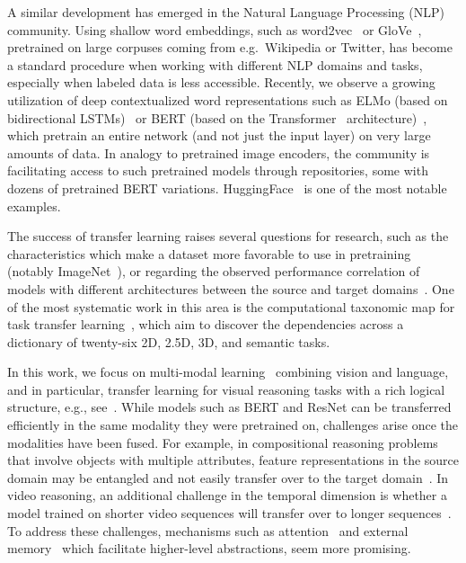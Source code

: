 A similar development has emerged in the Natural Language Processing (NLP) community.
Using shallow word embeddings, such as word2vec~\cite{mikolov2013distributed} or GloVe~\cite{pennington2014glove}, pretrained on large corpuses coming from e.g.\ Wikipedia or Twitter, has become a standard procedure when working with different NLP domains and tasks, 
especially when labeled data is less accessible.
Recently, we observe a growing utilization of deep contextualized word representations such as ELMo (based on bidirectional LSTMs)~\cite{peters2018deep} or BERT (based on the Transformer~\cite{vaswani2017attention} architecture)~\cite{devlin2018bert}, which pretrain an entire network (and not just the input layer) on very large amounts of data.
In analogy to pretrained image encoders, the community is facilitating access to such pretrained models through repositories, some with dozens of pretrained BERT variations. HuggingFace~\cite{wolf2019transformers} is one of the most notable examples.

The success of transfer learning raises several questions for research, such as the characteristics which make a dataset more favorable to use in pretraining (notably ImageNet~\cite{huh2016makes}), or regarding the observed performance correlation of models with different architectures between the source and target domains~\cite{kornblith2019better}.
One of the most systematic work in this area is the computational taxonomic map for task transfer learning~\cite{zamir2018taskonomy}, which aim to discover the dependencies across a dictionary of twenty-six 2D, 2.5D, 3D, and semantic tasks.

In this work, we focus on multi-modal learning~\cite{mogadala2019trends} combining vision and language,
and in particular, transfer learning for visual reasoning tasks with a rich logical structure, e.g., see~\cite{johnson2017clevr,yang2018dataset}. 
While models such as BERT and ResNet can be transferred efficiently in the same modality they were pretrained on, challenges arise
once the modalities have been fused.
For example, in compositional reasoning problems that involve objects with multiple attributes,
feature representations in the source domain may be entangled and not easily transfer over to the target domain~\cite{johnson2017clevr}.
In video reasoning, an additional challenge in the temporal dimension is whether a model trained on shorter video sequences will 
transfer over to longer sequences~\cite{yang2018dataset,song2018explore}.
To address these challenges, mechanisms such as attention~\cite{bahdanau2014neural} 
and external memory~\cite{graves2014neural, graves2016hybrid,weston2014memory} 
which facilitate higher-level abstractions, seem more promising.

